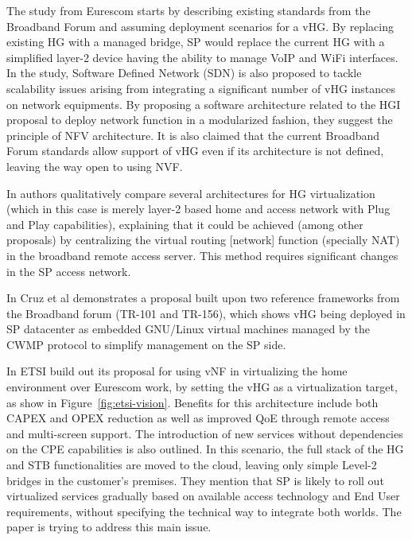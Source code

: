 The study from Eurescom \cite{daniel_abgrall_virtual_????} starts by describing existing standards from the Broadband Forum and assuming deployment scenarios for a vHG.
By replacing existing HG with a managed bridge, SP would replace the current HG with a simplified layer-2 device having the ability to manage VoIP and WiFi interfaces.
In the study, Software Defined Network (SDN) is also proposed to tackle scalability issues arising from integrating a significant number of vHG instances on network equipments.
By proposing a software architecture related to the HGI proposal to deploy network function in a modularized fashion, they suggest the principle of NFV architecture.
It is also claimed that the current Broadband Forum standards allow support of vHG even if its architecture is not defined, leaving the way open to using NVF.

In \cite{da_silva_home_2011} authors qualitatively compare several architectures for HG virtualization (which in this case is merely layer-2 based home and access network with Plug and Play capabilities), explaining that it could be achieved (among other proposals) by centralizing the virtual routing [network] function (specially NAT) in the broadband remote access server.
This method requires significant changes in the SP access network.

In \cite{cruz_architecture_2013} Cruz et al demonstrates a proposal built upon two reference frameworks from the Broadband forum (TR-101 and TR-156), which shows vHG being deployed in SP datacenter as embedded GNU/Linux virtual machines managed by the CWMP protocol to simplify management on the SP side.

In \cite{_network_2013} ETSI build out its proposal for using vNF in virtualizing the home environment over Eurescom work, by setting the vHG as a virtualization target, as show in Figure~\ref{fig:etsi-vision}.
Benefits for this architecture include both CAPEX and OPEX reduction as well as improved QoE through remote access and multi-screen support.
The introduction of new services without dependencies on the CPE capabilities is also outlined.
In this scenario, the full stack of the HG and STB functionalities are moved to the cloud, leaving only simple Level-2 bridges in the customer's premises.
They mention that SP is likely to roll out virtualized services gradually based on available access technology and End User requirements, without specifying the technical way to integrate both worlds.
The paper is trying to address this main issue.

